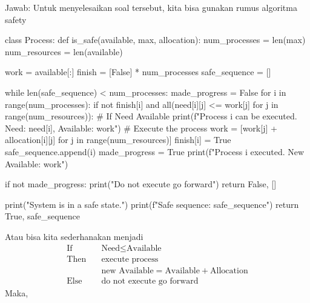 \documentclass[12pt]{article}
\begin{document}
Jawab:
\break Untuk menyelesaikan soal tersebut, kita bisa gunakan rumus algoritma safety
\begin{python}
    class Process:
    def is_safe(available, max, allocation):
    num_processes = len(max)
    num_resources = len(available)

    work = available[:]
    finish = [False] * num_processes
    safe_sequence = []

    while len(safe_sequence) < num_processes:
        made_progress = False
        for i in range(num_processes):
            if not finish[i] and all(need[i][j] <= work[j] for j in range(num_resources)):
                # If Need \leq Available
                print(f"Process {i} can be executed. Need: {need[i]}, Available: {work}")
                # Execute the process
                work = [work[j] + allocation[i][j] for j in range(num_resources)]
                finish[i] = True
                safe_sequence.append(i)
                made_progress = True
                print(f"Process {i} executed. New Available: {work}")
        
        if not made_progress:
            print("Do not execute go forward")
            return False, []

    print("System is in a safe state.")
    print(f"Safe sequence: {safe_sequence}")
    return True, safe_sequence
\end{python}

Atau bisa kita sederhanakan menjadi
\begin{align*}
    \text{If} \quad & \text{Need} \leq \text{Available} \\
    \text{Then} \quad & \text{execute process} \\
                    & \text{new Available} = \text{Available} + \text{Allocation} \\
    \text{Else} \quad & \text{do not execute go forward}
\end{align*}
Maka,
\end{document}
